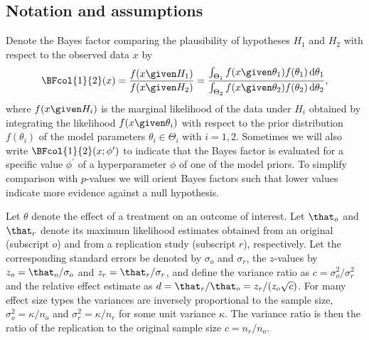 \subsection*{Notation and assumptions}
Denote the Bayes factor comparing the plausibility of hypotheses $H_1$ and $H_2$
with respect to the observed data $x$ by
\begin{align*}
  \BFcol{1}{2}(x) = \frac{f(x \given H_1)}{f(x \given H_2)}
  = \frac{\int_{\Theta_1} f(x \given \theta_1)f(\theta_1) \, \text{d}\theta_1}{
  \int_{\Theta_2} f(x \given \theta_2)f(\theta_2) \, \text{d}\theta_2},
\end{align*}
where $f(x \given H_i)$ is the marginal likelihood of the data under $H_i$
obtained by integrating the likelihood $f(x \given \theta_{i})$ with respect to
the prior distribution $f(\theta_{i})$ of the model parameters
$\theta_i \in \Theta_i$ with $i = 1, 2$. Sometimes we will also write
$\BFcol{1}{2}(x ; \phi^\prime)$ to indicate that the Bayes factor is evaluated
for a specific value $\phi^\prime$ of a hyperparameter $\phi$ of one of the
model priors. To simplify comparison with $p$-values we will orient Bayes
factors such that lower values indicate more evidence against a null hypothesis.

Let $\theta$ denote the effect of a treatment on an outcome of interest. Let
$\that_o$ and $\that_r$ denote its maximum likelihood estimates obtained from an
original (subscript $o$) and from a replication study (subscript $r$),
respectively. Let the corresponding standard errors be denoted by $\sigma_o$ and
$\sigma_r$, the $z$-values by $z_o = \that_o/\sigma_o$ and
$z_r = \that_r/\sigma_r$, and define the variance ratio as
$c = \sigma_o^2/\sigma_r^2$ and the relative effect estimate as
$d = \that_r/\that_o = z_r/(z_o\sqrt{c})$. For many effect size types the
variances are inversely proportional to the sample size, \ie{}
$\sigma^2_{o} = \kappa/n_{o}$ and $\sigma^2_{r} = \kappa/n_{r}$ for some unit
variance $\kappa$. The variance ratio is then the ratio of the replication to
the original sample size $c = n_{r}/n_{o}$.

